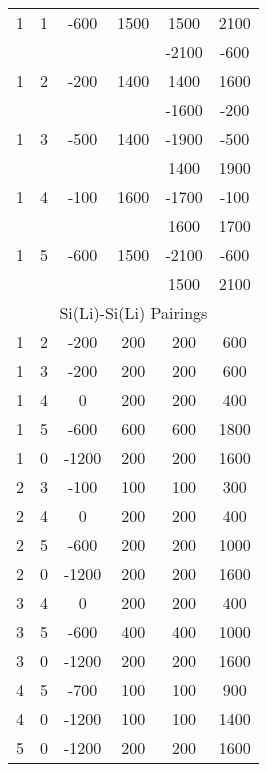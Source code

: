 \begin{longtable}{c|c|c|c|c|c}
        1 & 1 & -600 & 1500 & 1500 & 2100 \\
         &  &  &  & -2100 & -600\\
        1 & 2 & -200 & 1400 & 1400 & 1600 \\
         &  &  &  & -1600 & -200\\
        1 & 3 & -500 & 1400 & -1900 & -500 \\
         &  &  &  & 1400 & 1900\\
        1 & 4 & -100 & 1600 & -1700 & -100 \\
         &  &  &  & 1600 & 1700\\
        1 & 5 & -600 & 1500 & -2100 & -600 \\
         &  &  &  & 1500 & 2100\\
        \hline
        \multicolumn{6}{c}{Si(Li)-Si(Li) Pairings}\\
        \hline
        1 & 2 & -200 & 200 & 200 & 600 \\
        1 & 3 & -200 & 200 & 200 & 600 \\
        1 & 4 & 0 & 200 & 200 & 400 \\
        1 & 5 & -600 & 600 & 600 & 1800 \\
        1 & 0 & -1200 & 200 & 200 & 1600 \\
        2 & 3 & -100 & 100 & 100 & 300 \\
        2 & 4 & 0 & 200 & 200 & 400 \\
        2 & 5 & -600 & 200 & 200 & 1000 \\
        2 & 0 & -1200 & 200 & 200 & 1600 \\
        3 & 4 & 0 & 200 & 200 & 400 \\
        3 & 5 & -600 & 400 & 400 & 1000 \\
        3 & 0 & -1200 & 200 & 200 & 1600 \\
        4 & 5 & -700 & 100 & 100 & 900\\
        4 & 0 & -1200 & 100 & 100 & 1400 \\
        5 & 0 & -1200 & 200 & 200 & 1600\\
\end{longtable}